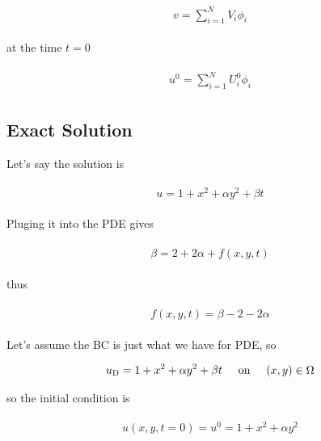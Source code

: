 \documentclass{article}
\begin{document}
	\begin{gather}
	\begin{split}
		v = \sum_{i=1}^{N}V_i\phi_i
	\end{split}
	\end{gather}
	
	at the time $t=0$
	
	\begin{gather}
	\begin{split}
	u^0 = \sum_{i=1}^{N}U^0_i\phi_i
	\end{split}
	\end{gather}
	
	
	
	\subsection*{Exact Solution}
	
	Let's say the solution is
	
	\begin{gather}
	\begin{split}
	u = 1 + x^2 + \alpha y^2 + \beta t
	\end{split}
	\end{gather}
	
	Pluging it into the PDE gives
	
	\begin{gather}
	\begin{split}
	 \beta = 2 + 2\alpha + f(x,y,t)
	\end{split}
	\end{gather}
	
	thus
	
	\begin{gather}
	\begin{split}
		f(x,y,t) = \beta - 2 - 2\alpha
	\end{split}
	\end{gather}
	
	Let's assume the BC is just what we have for PDE, so
	
	\begin{gather}
	\begin{split}
		u_\mathrm{D} = 1+x^2+\alpha y^2 + \beta t \hspace{5mm} \text{on} \hspace{5mm} (x,y)\in\Omega
	\end{split}
	\end{gather}
	
	so the initial condition is
	
	\begin{gather}
	\begin{split}
	u(x,y,t=0) = u^0 = 1+x^2+\alpha y^2
	\end{split}
	\end{gather}
	
\end{document}
